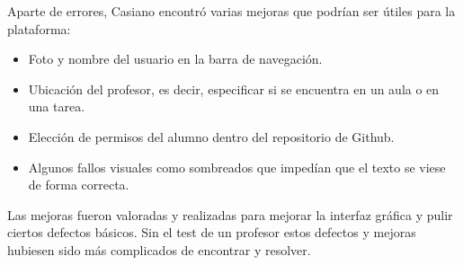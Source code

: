 \newpage

Aparte de errores, Casiano encontró varias mejoras que podrían ser útiles para la plataforma:

\begin{itemize}
    \item Foto y nombre del usuario en la barra de navegación.
    \item Ubicación del profesor, es decir, especificar si se encuentra en un aula o en una tarea.
    \item Elección de permisos del alumno dentro del repositorio de Github.
    \item Algunos fallos visuales como sombreados que impedían que el texto se viese de forma correcta.
\end{itemize}


Las mejoras fueron valoradas y realizadas para mejorar la interfaz gráfica y pulir ciertos defectos básicos.
Sin el test de un profesor estos defectos y mejoras hubiesen sido más complicados de encontrar y resolver.
